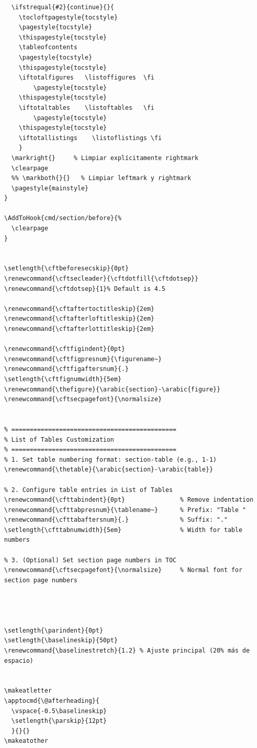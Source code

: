 \documentclass[english]{reporti}
\begin{document}
\begin{verbatim}
  \ifstrequal{#2}{continue}{}{
    \tocloftpagestyle{tocstyle}
    \pagestyle{tocstyle}
    \thispagestyle{tocstyle}
    \tableofcontents
    \pagestyle{tocstyle}
    \thispagestyle{tocstyle}    
    \iftotalfigures   \listoffigures  \fi
        \pagestyle{tocstyle}
    \thispagestyle{tocstyle}
    \iftotaltables    \listoftables   \fi
        \pagestyle{tocstyle}
    \thispagestyle{tocstyle}
    \iftotallistings    \listoflistings \fi
    }
  \markright{}     % Limpiar explícitamente rightmark
  \clearpage
  %% \markboth{}{}   % Limpiar leftmark y rightmark
  \pagestyle{mainstyle}
}

\AddToHook{cmd/section/before}{%
  \clearpage
}


\setlength{\cftbeforesecskip}{0pt}
\renewcommand{\cftsecleader}{\cftdotfill{\cftdotsep}}
\renewcommand{\cftdotsep}{1}% Default is 4.5

\renewcommand{\cftaftertoctitleskip}{2em}
\renewcommand{\cftafterloftitleskip}{2em}
\renewcommand{\cftafterlottitleskip}{2em}

\renewcommand{\cftfigindent}{0pt}
\renewcommand{\cftfigpresnum}{\figurename~}
\renewcommand{\cftfigaftersnum}{.}
\setlength{\cftfignumwidth}{5em}
\renewcommand{\thefigure}{\arabic{section}-\arabic{figure}}
\renewcommand{\cftsecpagefont}{\normalsize}


% =============================================
% List of Tables Customization
% =============================================
% 1. Set table numbering format: section-table (e.g., 1-1)
\renewcommand{\thetable}{\arabic{section}-\arabic{table}}

% 2. Configure table entries in List of Tables
\renewcommand{\cfttabindent}{0pt}               % Remove indentation
\renewcommand{\cfttabpresnum}{\tablename~}      % Prefix: "Table "
\renewcommand{\cfttabaftersnum}{.}              % Suffix: "."
\setlength{\cfttabnumwidth}{5em}                % Width for table numbers

% 3. (Optional) Set section page numbers in TOC
\renewcommand{\cftsecpagefont}{\normalsize}     % Normal font for section page numbers




\setlength{\parindent}{0pt}
\setlength{\baselineskip}{50pt}
\renewcommand{\baselinestretch}{1.2} % Ajuste principal (20% más de espacio)


\makeatletter
\apptocmd{\@afterheading}{
  \vspace{-0.5\baselineskip}
  \setlength{\parskip}{12pt}
  }{}{}
\makeatother




\end{verbatim}
\end{document}
